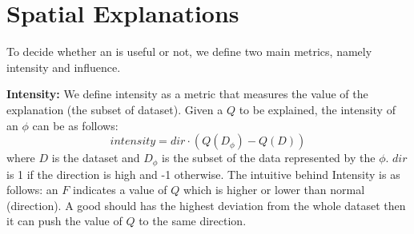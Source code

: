 
\section{Spatial Explanations}

To decide whether an {\explanation} is useful or not, we define two main metrics, namely intensity and influence. 

{\bf Intensity:} We define intensity as a metric that measures the {\fact} value of the explanation (the subset of dataset). Given a {\fact} $Q$ to be explained, the intensity of an {\explanation} $\phi$ can be as follows:
$$intensity = dir \cdot (Q (D_\phi) - Q(D)) $$
where $D$ is the dataset and $D_\phi$ is the subset of the data represented by the {\explanation} $\phi$. $dir$ is 1 if the direction is high and -1 otherwise. 
The intuitive behind Intensity is as follows: an {\fact} $F$ indicates a value of $Q$ which is higher or lower than normal (direction). A good {\explanation} should has the highest deviation from the whole dataset then it can push the value of $Q$ to the same direction. 


